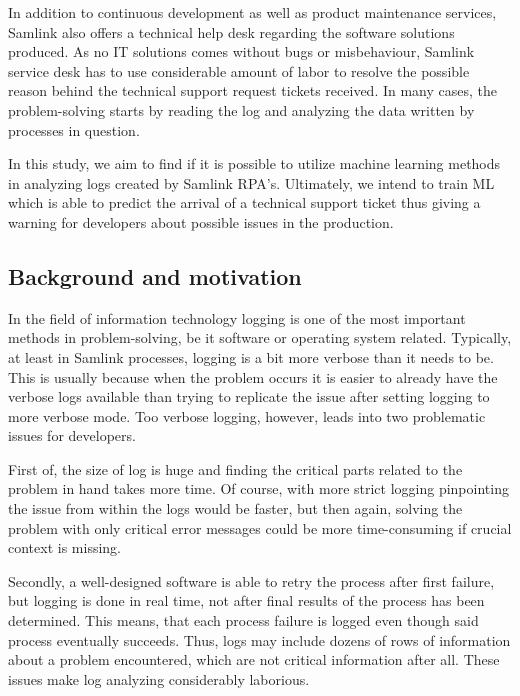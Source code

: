 In addition to continuous development
as well as product maintenance services,
Samlink also offers a technical help desk
regarding the software solutions produced.
As no IT solutions comes without bugs or misbehaviour,
Samlink service desk has to use considerable amount of labor
to resolve the possible reason
behind the technical support request tickets received.
In many cases,
the problem-solving starts by reading the log
and analyzing the data written by processes in question.

In this study,
we aim to find if it is possible to utilize
machine learning methods in analyzing logs
created by Samlink RPA's.
Ultimately,
we intend to train ML
which is able to predict the arrival of a technical support ticket
thus giving a warning for developers about possible issues
in the production.



\subsection{Background and motivation}\label{subsec:intro-background-and-motivation}
In the field of information technology
logging is one of the most important methods
in problem-solving,
be it software or operating system related.\cite{delarosa2018log}
Typically,
at least in Samlink processes,
logging is a bit more verbose
than it needs to be.
This is usually because when the problem occurs
it is easier to already have the verbose logs available
than trying to replicate the issue
after setting logging to more verbose mode.
Too verbose logging, however,
leads into two problematic issues for developers.

First of, the size of log is huge
and finding the critical parts
related to the problem in hand
takes more time.
Of course,
with more strict logging
pinpointing the issue from within the logs
would be faster,
but then again,
solving the problem with only critical error messages
could be more time-consuming
if crucial context is missing.

Secondly,
a well-designed software
is able to retry the process after first failure,
but logging is done in real time,
not after final results of the process has been determined.
This means,
that each process failure is logged
even though said process eventually succeeds.
Thus,
logs may include dozens of rows of information about a problem encountered,
which are not critical information after all.
These issues make log analyzing considerably laborious.

